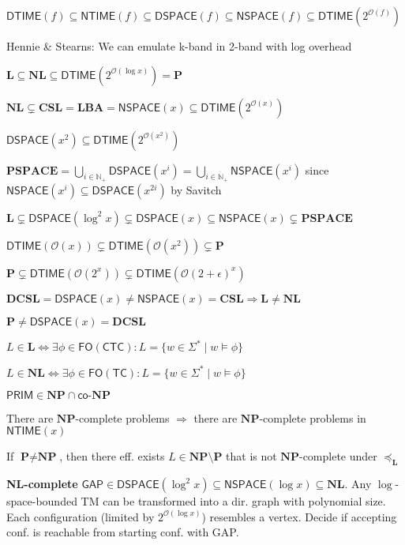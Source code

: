 \documentclass[10pt, twocolumn, parskip=never]{scrartcl}
\newcommand{\fat}[1]{\textbf{#1}}
\newcommand{\newthing}[1]{\fat{\faicon{caret-right} #1}}
\newcommand{\DTIME}[1]{\textsf{DTIME}(#1)}
\newcommand{\NTIME}[1]{\textsf{NTIME}(#1)}
\newcommand{\DSPACE}[1]{\textsf{DSPACE}(#1)}
\newcommand{\NSPACE}[1]{\textsf{NSPACE}(#1)}
\newcommand{\prob}[1]{\textsf{#1}}
\newcommand{\bigO}[1]{\mathcal{O}(#1)}
\newcommand{\reduce}{\preceq}
\newcommand{\lreduce}{\reduce_{\fat{L}}}
\begin{document}
\vfill

$\DTIME{f} \subseteq \NTIME{f} \subseteq \DSPACE{f} \subseteq \NSPACE{f} \subseteq \DTIME{2^{\bigO{f}}}$

Hennie \& Stearns: We can emulate k-band in 2-band with log overhead

$\fat{L} \subseteq \fat{NL} \subseteq \DTIME{2^{\mathcal{O}(\log{x})}} = \fat{P}$

$\fat{NL} \subsetneq \fat{CSL} = \fat{LBA} = \NSPACE{x} \subseteq \DTIME{2^{\mathcal{O}(x)}}$

$\DSPACE{x^2} \subseteq \DTIME{2^{\mathcal{O}(x^2)}}$

$\fat{PSPACE} = \bigcup_{i \in \mathbb{N}_+}{\DSPACE{x^i}} = \bigcup_{i \in \mathbb{N}_+}{\NSPACE{x^i}}$ since $\NSPACE{x^i} \subseteq \DSPACE{x^{2i}}$ by Savitch

$\fat{L} \subsetneq \DSPACE{\log^2{x}} \subsetneq \DSPACE{x} \subseteq \NSPACE{x} \subsetneq \fat{PSPACE}$

$\DTIME{\mathcal{O}(x)} \subsetneq \DTIME{\mathcal{O}(x^2)} \subsetneq \fat{P}$

$\fat{P} \subsetneq \DTIME{\mathcal{O}(2^x)} \subsetneq \DTIME{\mathcal{O}(2 + \epsilon)^x}$

$\fat{DCSL} = \DSPACE{x} \neq \NSPACE{x} = \fat{CSL} \Rightarrow \fat{L} \neq \fat{NL}$

$\fat{P} \neq \DSPACE{x} = \fat{DCSL}$

$L \in \fat{L} \Leftrightarrow \exists \phi \in \textsf{FO}(\textsf{CTC})\colon L = \{ w \in \Sigma^* \mid w \models \phi \}$

$L \in \fat{NL} \Leftrightarrow \exists \phi \in \textsf{FO}(\textsf{TC})\colon L = \{ w \in \Sigma^* \mid w \models \phi \}$

$\textsf{PRIM} \in \fat{NP} \cap \textsf{co-}\fat{NP}$

There are $\fat{NP}$-complete problems $\Rightarrow$ there are $\fat{NP}$-complete problems in $\NTIME{x}$

If $\fat{P} \neq \fat{NP}$, then there eff. exists $L \in \fat{NP} \setminus \fat{P}$ that is not $\fat{NP}$-complete under $\lreduce$

\vspace{0.5em}

\newthing{\fat{NL}-complete} $\prob{GAP} \in \DSPACE{\log^2{x}} \subseteq \NSPACE{\log{x}} \subseteq \fat{NL}$. Any $\log$-space-bounded TM can be transformed into a dir. graph with polynomial size. Each configuration (limited by $2^{\bigO{\log{x}}}$) resembles a vertex. Decide if accepting conf. is reachable from starting conf. with \prob{GAP}.
\end{document}
